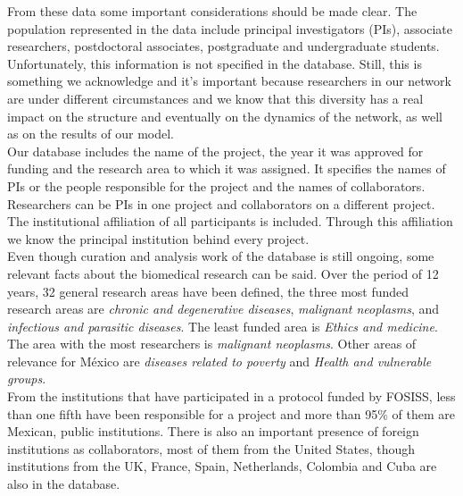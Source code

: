 \documentclass[11pt]{article}
\begin{document}
From these data some important considerations should be made clear. The
population represented in the data include principal investigators (PIs),
associate researchers, postdoctoral associates, postgraduate and undergraduate
students.
Unfortunately, this information is not specified in the
database. Still, this is something we acknowledge and it's important because
researchers in our network are under different circumstances and we know
that this diversity has a real impact on the structure and eventually on the
dynamics of the network, as well as on the results of our model.\\  

Our database includes the
name of the project, the year it was approved for funding and the research area
to which it was assigned. It specifies the names of PIs or the people 
responsible for the project and the names of collaborators.
Researchers can be PIs in one project and collaborators on a different project. The institutional
affiliation of all participants is included. Through this affiliation
we know the principal institution
behind every project.\\ 

Even though curation and analysis work of the database is still ongoing, some
relevant facts about the biomedical research can be said. Over the period of 12
years, 32 general research areas have been defined, the three most funded
research areas are \emph{chronic and degenerative diseases}, \emph{malignant
  neoplasms}, and \emph{infectious and parasitic diseases}. The least funded
area is \emph{Ethics and medicine}. The area with the most researchers is
\emph{malignant neoplasms}. Other areas of relevance for M\'exico are
\emph{diseases related to poverty} and \emph{Health and vulnerable groups}. \\  

From the institutions that have participated in a protocol funded by FOSISS,
less than one fifth have been responsible for a project and more than 95\% of
them are Mexican, public institutions. There is also an important presence of
foreign institutions as collaborators, most of them from the United States,
though institutions from the UK, France, Spain, Netherlands, Colombia and Cuba
are also in the database.\\ 
\end{document}
